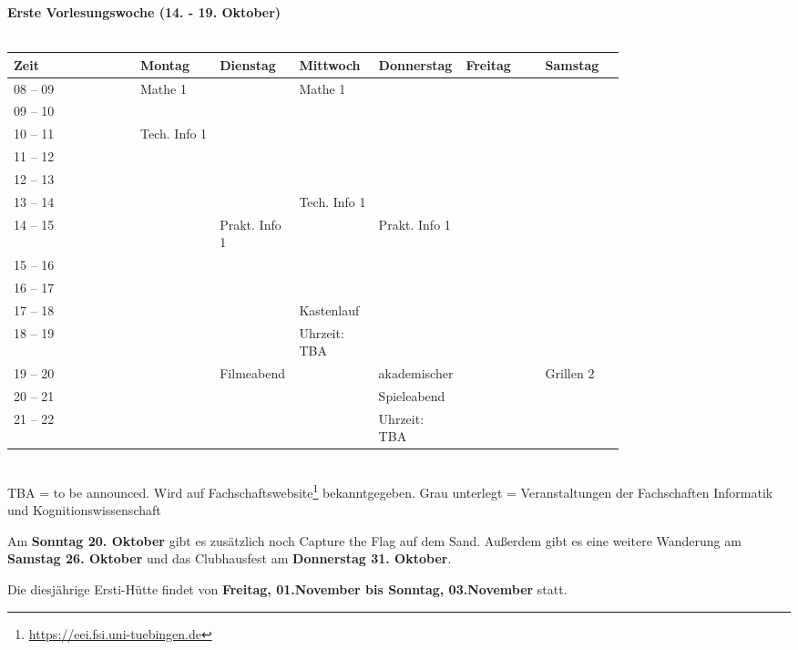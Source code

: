\textbf{Erste Vorlesungswoche (14. - 19. Oktober)}\\
\\
\begin{tabular}{|l|p{0.13\linewidth}|p{0.13\linewidth}|p{0.13\linewidth}|p{0.13\linewidth}|p{0.13\linewidth}|p{0.13\linewidth}|} \hline
 Zeit & Montag & Dienstag & Mittwoch & Donnerstag & Freitag & Samstag \\ 
 \hline \hline \cline{3-3}
 08 -- 09 & \footnotesize{Mathe 1} & & \footnotesize{Mathe 1} & & &\\ \cline{1-1}
 09 -- 10 &  & & & & &  \\ \cline{1-1} \cline{2-2} \cline{4-4}
 10 -- 11 & \footnotesize{Tech. Info 1} & & & & & \\ \cline{1-1}
 11 -- 12 & & & & & & \\ \cline{1-1} \cline{2-2}
 12 -- 13 & & & & & & \\ \cline{1-1} \cline{4-4}
 13 -- 14 & & & \footnotesize{Tech. Info 1}  & & & \\ \cline{1-1} \cline{3-3} \cline{4-4} \cline{5-5}
 14 -- 15 & &\footnotesize{Prakt. Info 1} & &\footnotesize{Prakt. Info 1} & & \\ \cline{1-1}
 15 -- 16 & & & & & & \\ \cline {1-1} \cline{3-3} \cline{5-5}
 16 -- 17 & & & & & & \\ \cline{1-1}
 17 -- 18 & & &\cellcolor{lightlightgray} \footnotesize{Kastenlauf} & & & \\ \cline{1-1}
  18 -- 19 & & &\cellcolor{lightlightgray} \footnotesize{Uhrzeit: TBA}  & & &  \\ \cline{1-1}
 19 -- 20 & &\cellcolor{lightlightgray} \footnotesize{Filmeabend} & \cellcolor{lightlightgray} & \cellcolor{lightlightgray} \footnotesize{akademischer} & & \cellcolor{lightlightgray} \footnotesize{Grillen 2} \\ \cline{1-1}
 20 -- 21 & &\cellcolor{lightlightgray} &\cellcolor{lightlightgray}  & \cellcolor{lightlightgray} \footnotesize{Spieleabend} & & \cellcolor{lightlightgray}\\ \cline{1-1}
 21 -- 22 & &\cellcolor{lightlightgray} & \cellcolor{lightlightgray} & \cellcolor{lightlightgray} \footnotesize{Uhrzeit: TBA}& & \cellcolor{lightlightgray}\\ \hline
\end{tabular}
\\
{\scriptsize TBA = to be announced. Wird auf Fachschaftswebsite\footnote{\url{https://eei.fsi.uni-tuebingen.de}}  bekanntgegeben.}
{\scriptsize Grau unterlegt = Veranstaltungen der Fachschaften Informatik und Kognitionswissenschaft }

\normalsize
Am \textbf{Sonntag 20. Oktober} gibt es zusätzlich noch Capture the Flag auf dem Sand. Außerdem gibt es eine weitere Wanderung am \textbf{Samstag 26. Oktober} und das Clubhausfest am \textbf{Donnerstag 31. Oktober}.

Die diesjährige Ersti-Hütte findet von \textbf{Freitag, 01.November bis Sonntag, 03.November} statt. 

\newpage
\normalsize


